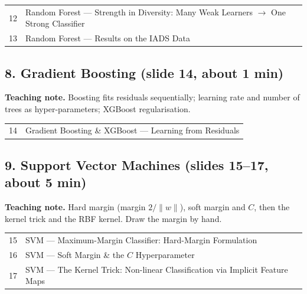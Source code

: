\documentclass[11pt]{article}
\begin{document}
\begin{center}\small\renewcommand{\arraystretch}{1.1}\begin{tabularx}{\textwidth}{@{}r X@{}}12 & Random Forest --- Strength in Diversity: Many Weak Learners $\to$ One Strong Classifier\\
13 & Random Forest --- Results on the IADS Data\\\end{tabularx}\end{center}

\subsection{8. Gradient Boosting \normalfont\small\color{GreyN}(slide 14, about 1 min)}

\textbf{Teaching note.} Boosting fits residuals sequentially; learning rate and number of trees as hyper-parameters; XGBoost regularisation.

\begin{center}\small\renewcommand{\arraystretch}{1.1}\begin{tabularx}{\textwidth}{@{}r X@{}}14 & Gradient Boosting \& XGBoost --- Learning from Residuals\\\end{tabularx}\end{center}

\subsection{9. Support Vector Machines \normalfont\small\color{GreyN}(slides 15--17, about 5 min)}

\textbf{Teaching note.} Hard margin (margin $2/\|w\|$), soft margin and $C$, then the kernel trick and the RBF kernel. Draw the margin by hand.

\begin{center}\small\renewcommand{\arraystretch}{1.1}\begin{tabularx}{\textwidth}{@{}r X@{}}15 & SVM --- Maximum-Margin Classifier: Hard-Margin Formulation\\
16 & SVM --- Soft Margin \& the $C$ Hyperparameter\\
17 & SVM --- The Kernel Trick: Non-linear Classification via Implicit Feature Maps\\\end{tabularx}\end{center}
\end{document}
